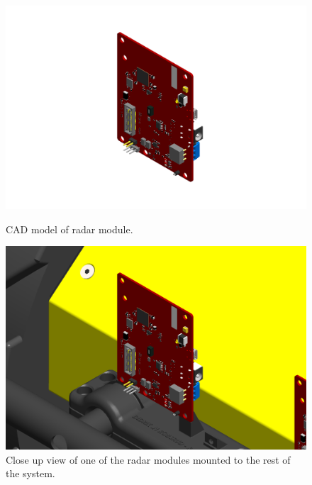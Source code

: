 \begin{figure}[H]
    \centering
    \begin{minipage}[b]{0.49\textwidth}
        \includegraphics[width=\textwidth]{Figures/CAD/radar.PNG}
        \caption{CAD model of radar module.}
        \label{fig:radar}
    \end{minipage}
    \begin{minipage}[b]{0.49\textwidth}
        \includegraphics[width=\textwidth]{Figures/CAD/radarMounted.PNG}
        \caption{Close up view of one of the radar modules mounted to the rest of the system.}
        \label{fig:radarMounted}
    \end{minipage}
\end{figure}

